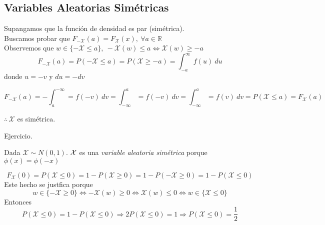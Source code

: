 \subsection{Variables Aleatorias Simétricas}




\begin{myproof}
  \boxed{\Leftarrow} Supangamos que la función de densidad es par (simétrica). \\Buscamos probar que $F_{\mathcal {-X}}(a) = F_{\mathcal X}(x),~ \forall a \in \mathbb R$\\
  Observemos que $w \in \{-\mathcal X \le a\},~ -\mathcal X (w)\le a \Leftrightarrow \mathcal X(w) \ge -a$
  \[F_{-\mathcal X}(a) = P(-\mathcal X \le a) = P(\mathcal X \ge -a) = \int_{-a}^{\infty} f(u)~du\] donde $u = -v$ y $du = -dv$

  \[F_{-\mathcal X}(a) = - \int_{a}^{-\infty} = f(-v)~dv = \int_{-\infty}^a = f(-v)~dv = \int_{-\infty}^a = f(v)~dv = P(\mathcal X \le a) = F_{\mathcal X}(a)\]
  \begin{center}
    $\therefore \, \mathcal X$ es simétrica.
  \end{center}
  \boxed{\Rightarrow} Ejercicio.

\end{myproof}

 {
  Dada $\mathcal X \sim N(0,1)$. $\mathcal{X}$ es una \textit{variable aleatoria simétrica} porque $\phi(x) = \phi(-x)$
}


\begin{myproof}
  \[F_{\mathcal X}(0) = P(\mathcal X \le 0) = 1 - P(\mathcal X \ge 0) = 1 - P(-\mathcal X \ge 0) = 1 - P(\mathcal X \le 0)\]
  Este hecho se justfica porque
  \[w \in \{-\mathcal X  \ge 0\} \Leftrightarrow -\mathcal X(w) \ge 0 \Leftrightarrow \mathcal X(w) \le 0 \Leftrightarrow w \in \{\mathcal X \le 0\}\]
  Entonces
  \[P(\mathcal X \le 0) = 1 - P(\mathcal X \le 0) \Rightarrow 2P(\mathcal X \le 0)= 1 \Rightarrow P(\mathcal X \le 0) = \frac12\]
\end{myproof}


